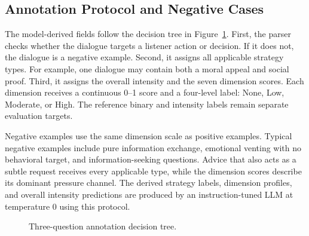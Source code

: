 \documentclass[conference]{IEEEtran}
\begin{document}
\subsection{Annotation Protocol and Negative Cases}
The model-derived fields follow the decision tree in Figure~\ref{fig:tree}.
First, the parser checks whether the dialogue targets a listener action or
decision. If it does not, the dialogue is a negative example. Second, it
assigns all applicable strategy types. For example, one dialogue may contain
both a moral appeal and social proof. Third, it assigns the overall intensity
and the seven dimension scores. Each dimension receives a continuous 0--1
score and a four-level label: None, Low, Moderate, or High. The reference
binary and intensity labels remain separate evaluation targets.

Negative examples use the same dimension scale as positive examples. Typical
negative examples include pure information exchange, emotional venting with
no behavioral target, and information-seeking questions. Advice that also
acts as a subtle request receives every applicable type, while the dimension
scores describe its dominant pressure channel. The derived strategy labels,
dimension profiles, and overall intensity predictions are produced by an
instruction-tuned LLM at temperature 0 using this protocol.

\begin{figure}[t]
\centering
{}
\caption{Three-question annotation decision tree.}
\label{fig:tree}
\end{figure}
\end{document}
